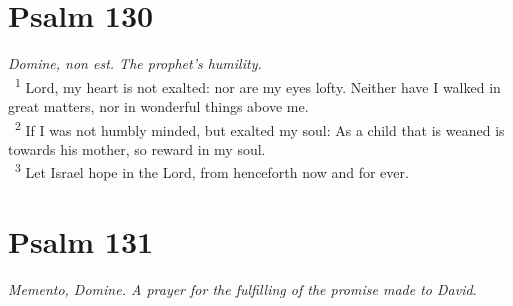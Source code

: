 \documentclass[a5paper,12pt]{article}
\begin{document}
\begin{multicols*}{2}
\section{Psalm 130}
\label{sec:org2b4050f}
\emph{Domine, non est. The prophet's humility.}\\

~\textsuperscript{1} Lord, my heart is not exalted: nor are my eyes lofty. Neither have I walked in great matters, nor in wonderful things above me.\\
~\textsuperscript{2} If I was not humbly minded, but exalted my soul: As a child that is weaned is towards his mother, so reward in my soul.\\
~\textsuperscript{3} Let Israel hope in the Lord, from henceforth now and for ever.\\

\section{Psalm 131}
\label{sec:orgca5d88c}
\emph{Memento, Domine. A prayer for the fulfilling of the promise made to David.}\\


\end{multicols*}
\end{document}
